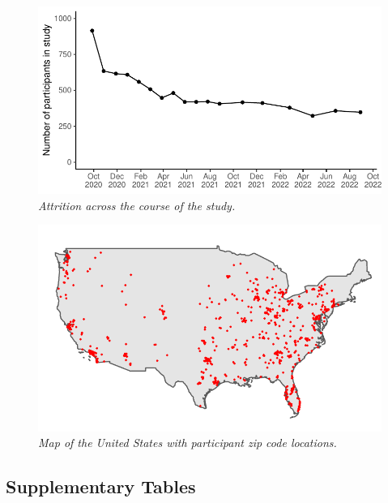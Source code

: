 \documentclass[
  man, donotrepeattitle,floatsintext]{apa6}
\begin{document}
\newpage



\begin{figure}
\centering
\includegraphics{manuscript_files/figure-latex/plotAttrition-1.pdf}
\caption{\label{fig:plotAttrition}\emph{Attrition across the course of the study.}}
\end{figure}

\newpage



\begin{figure}
\centering
\includegraphics{manuscript_files/figure-latex/plotUSMap-1.pdf}
\caption{\label{fig:plotUSMap}\emph{Map of the United States with participant zip code locations.}}
\end{figure}

\newpage

\hypertarget{supplementary-tables}{%
\subsection{Supplementary Tables}\label{supplementary-tables}}
\end{document}
